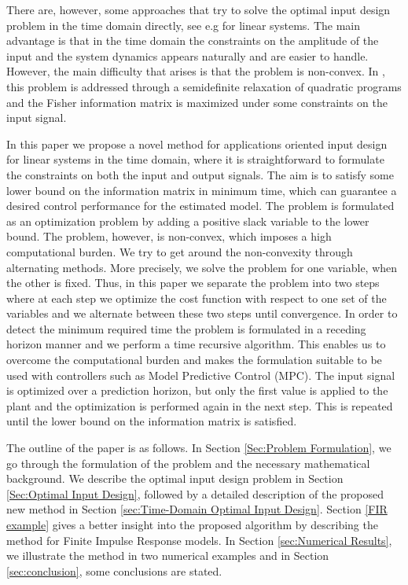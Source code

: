 \documentclass{ifacconf}
\begin{document}
There are, however, some approaches that try to solve the optimal input design problem in the time domain directly, see e.g \cite{Manchester} for linear systems. The main advantage is that in the time domain the constraints on the amplitude of the input and the system dynamics appears naturally and are easier to handle. However, the main difficulty that arises is that the problem is non-convex. In \cite{Manchester}, this problem is addressed through a semidefinite relaxation of quadratic programs and the Fisher information matrix is maximized under some constraints on the input signal. 

In this paper we propose a novel method for applications oriented input design for linear systems in the time domain, where it is straightforward to formulate the constraints on both the input and output signals. The aim is to satisfy some lower bound on the information matrix  in minimum time, which can guarantee a desired control performance for the estimated model. The problem is formulated as an optimization problem by adding a positive slack variable to the lower bound. The problem, however, is non-convex, which imposes a high computational burden. We try to get around the non-convexity through alternating methods. More precisely, we solve the problem for one variable, when the other is fixed. Thus, in this paper we separate the problem into two steps where at each step we optimize the cost function with respect to one set of the variables and we alternate between these two steps until convergence. In order to detect the minimum required time the problem is formulated in a receding horizon manner and we perform a time recursive algorithm. This enables us to overcome the computational burden and makes the formulation suitable to be used with controllers such as Model Predictive Control (MPC). The input signal is optimized over a prediction horizon, but only the first value is applied to the plant and the optimization is performed again in the next step. This is repeated until the lower bound on the information matrix is satisfied.

The outline of the paper is as follows. In Section \ref{Sec:Problem Formulation}, we go through the formulation of the problem and the necessary mathematical background. We describe the optimal input design problem in Section \ref{Sec:Optimal Input Design}, followed by a detailed description of the proposed new method in Section \ref{sec:Time-Domain Optimal Input Design}.  Section \ref{FIR example} gives a better insight into the proposed algorithm by describing the method for Finite Impulse Response models. In Section \ref{sec:Numerical Results}, we illustrate the method in two numerical examples and in Section \ref{sec:conclusion}, some conclusions are stated.
\end{document}
